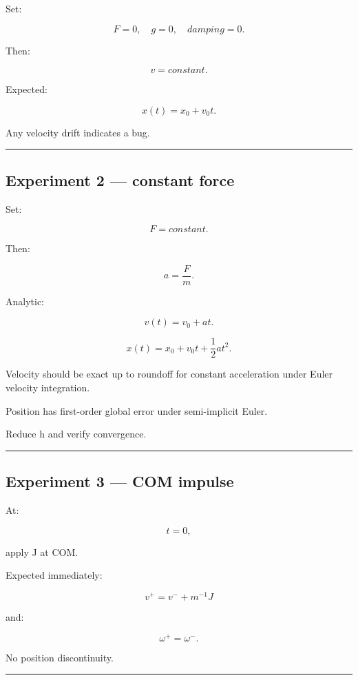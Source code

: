 Set:

\[
F=0,
\quad
g=0,
\quad
damping=0.
\]

Then:

\[
v=constant.
\]

Expected:

\[
x(t)
=
x_0+v_0t.
\]

Any velocity drift indicates a bug.

\begin{center}\rule{0.5\linewidth}{0.5pt}\end{center}

\subsection{Experiment 2 --- constant force}\label{06-engine-ii-ch039-experiment-2-constant-force}

Set:

\[
F=constant.
\]

Then:

\[
a=\frac Fm.
\]

Analytic:

\[
v(t)=v_0+at.
\]

\[
x(t)
=
x_0+
v_0t+
\frac12at^2.
\]

Velocity should be exact up to roundoff for constant acceleration under Euler velocity integration.

Position has first-order global error under semi-implicit Euler.

Reduce h and verify convergence.

\begin{center}\rule{0.5\linewidth}{0.5pt}\end{center}

\subsection{Experiment 3 --- COM impulse}\label{06-engine-ii-ch039-experiment-3-com-impulse}

At:

\[
t=0,
\]

apply J at COM.

Expected immediately:

\[
v^+
=
v^-+
m^{-1}J
\]

and:

\[
\omega^+=\omega^-.
\]

No position discontinuity.

\begin{center}\rule{0.5\linewidth}{0.5pt}\end{center}

